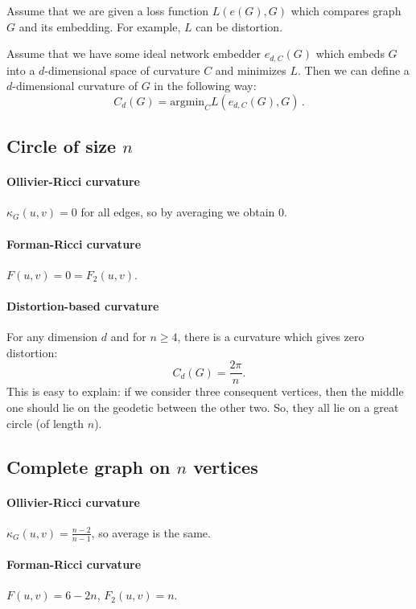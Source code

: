 \documentclass{article}
\begin{document}
Assume that we are given a loss function $L(e(G),G)$ which compares graph $G$ and its embedding. For example, $L$ can be distortion.

Assume that we have some ideal network embedder $e_{d,C}(G)$ which embeds $G$ into a $d$-dimensional space of curvature $C$ and minimizes $L$. Then we can define a $d$-dimensional curvature of $G$ in the following way:
\[
C_d(G) = \textrm{argmin}_C L(e_{d,C}(G),G)\,.
\]

\subsection{Circle of size $n$}
                     
\paragraph{Ollivier-Ricci curvature} $\kappa_G(u,v) = 0$ for all edges, so by averaging we obtain $0$.

\paragraph{Forman-Ricci curvature} $F(u,v) = 0 = F_2(u,v)$.

\paragraph{Distortion-based curvature} For any dimension $d$ and for $n \ge 4$, there is a curvature which gives zero distortion:
\[
C_d(G) = \frac{2\pi}{n}.
\]
This is easy to explain: if we consider three consequent vertices, then the middle one should lie on the geodetic between the other two. So, they all lie on a great circle (of length $n$).

\subsection{Complete graph on $n$ vertices}

\paragraph{Ollivier-Ricci curvature} 
        
$\kappa_G(u,v) = \frac{n-2}{n-1}$, so average is the same.

\paragraph{Forman-Ricci curvature} $F(u,v) = 6 - 2n$, $F_2(u,v) = n$.
\end{document}

